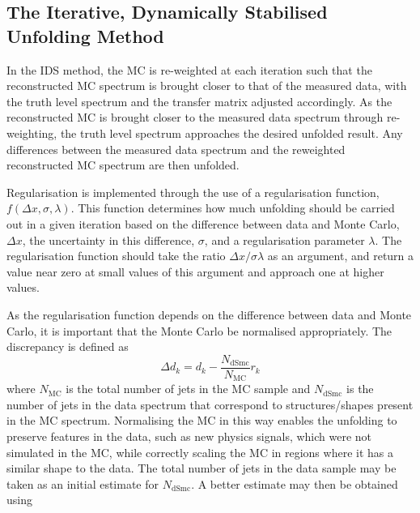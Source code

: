 \subsection{The Iterative, Dynamically Stabilised Unfolding Method}

In the IDS method, the MC is re-weighted at each iteration such that the reconstructed MC spectrum is brought closer to that of the measured data, with the truth level spectrum and the transfer matrix adjusted accordingly. As the reconstructed MC is brought closer to the measured data spectrum through re-weighting, the truth level spectrum approaches the desired unfolded result. Any differences between the measured data spectrum and the reweighted reconstructed MC spectrum are then unfolded.

Regularisation is implemented through the use of a regularisation function, $f(\Delta x,\sigma,\lambda)$. This function determines how much unfolding should be carried out in a given iteration based on the difference between data and Monte Carlo, $\Delta x$, the uncertainty in this difference, $\sigma$, and a regularisation parameter $\lambda$. The regularisation function should take the ratio $\Delta x/\sigma \lambda$ as an argument, and return a value near zero at small values of this argument and approach one at higher values.   

As the regularisation function depends on the difference between data and Monte Carlo, it is important that the Monte Carlo be normalised appropriately. The discrepancy is defined as 
\begin{equation}
\Delta d_k = d_k - \frac{N_{\mathrm{dSmc}}}{N_\mathrm{MC}} r_{k}
\end{equation}
where $N_\mathrm{MC}$ is the total number of jets in the MC sample and $N_{\mathrm{dSmc}}$ is the number of jets in the data spectrum that correspond to structures/shapes present in the MC spectrum. Normalising the MC in this way enables the unfolding to preserve features in the data, such as new physics signals, which were not simulated in the MC, while correctly scaling the MC in regions where it has a similar shape to the data. The total number of jets in the data sample may be taken as an initial estimate for $N_{\mathrm{dSmc}}$. A better estimate may then be obtained using

